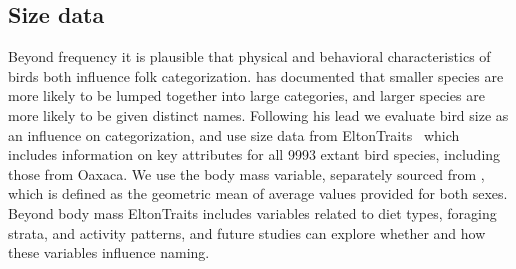 \documentclass[10pt,letterpaper]{article}
\begin{document}
\subsection{Size data}
Beyond frequency it is plausible that physical and behavioral characteristics of birds both influence folk categorization.  has documented that smaller species are more likely to be lumped together into large categories, and larger species are more likely to be given distinct names. Following his lead we evaluate bird size as an influence on categorization, and use size data from EltonTraits~\cite{wilman2014eltontraits} which includes information on key attributes for all 9993 extant bird species, including those from Oaxaca.  We use the body mass variable, separately sourced from \cite{dunning2007crc}, which is defined as the geometric mean of average values provided for both sexes. Beyond body mass EltonTraits includes variables related to diet types, foraging strata, and activity patterns, and future studies can explore whether and how these variables influence naming. 

%
%
\end{document}
